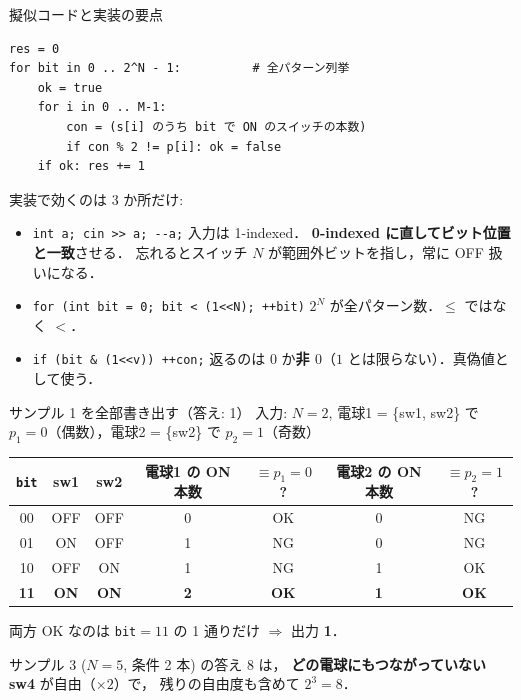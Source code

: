 \documentclass[dvipdfmx,aspectratio=169]{beamer}
\begin{document}
\begin{frame}[fragile]{擬似コードと実装の要点}
\begin{verbatim}
res = 0
for bit in 0 .. 2^N - 1:          # 全パターン列挙
    ok = true
    for i in 0 .. M-1:
        con = (s[i] のうち bit で ON のスイッチの本数)
        if con % 2 != p[i]: ok = false
    if ok: res += 1
\end{verbatim}

  \vspace{0.2em}
  実装で効くのは 3 か所だけ:
  \begin{itemize}
    \item \verb|int a; cin >> a; --a;| \quad 入力は 1-indexed．
      \textbf{0-indexed に直してビット位置と一致}させる．
      忘れるとスイッチ $N$ が範囲外ビットを指し，常に OFF 扱いになる．
    \item \verb|for (int bit = 0; bit < (1<<N); ++bit)| \quad
      $2^N$ が全パターン数．$\le$ ではなく $<$．
    \item \verb|if (bit & (1<<v)) ++con;| \quad
      返るのは $0$ か\textbf{非 $0$}（$1$ とは限らない）．真偽値として使う．
  \end{itemize}
\end{frame}

\begin{frame}{サンプル 1 を全部書き出す（答え: 1）}
  入力: $N=2$, 電球1 = \{sw1, sw2\} で $p_1=0$（偶数），電球2 = \{sw2\} で $p_2=1$（奇数）

  \vspace{0.5em}
  \centering
  \begin{tabular}{ccccccc}
    \toprule
    \texttt{bit} & sw1 & sw2 & 電球1 の ON 本数 & $\equiv p_1{=}0$? & 電球2 の ON 本数 & $\equiv p_2{=}1$?\\
    \midrule
    00 & OFF & OFF & 0 & \textcolor{ok}{OK}  & 0 & \textcolor{ng}{NG}\\
    01 & ON  & OFF & 1 & \textcolor{ng}{NG}  & 0 & \textcolor{ng}{NG}\\
    10 & OFF & ON  & 1 & \textcolor{ng}{NG}  & 1 & \textcolor{ok}{OK}\\
    \textbf{11} & \textbf{ON} & \textbf{ON} & \textbf{2} & \textcolor{ok}{\textbf{OK}} & \textbf{1} & \textcolor{ok}{\textbf{OK}}\\
    \bottomrule
  \end{tabular}

  \vspace{0.8em}
  \raggedright
  両方 OK なのは \texttt{bit}$=11$ の 1 通りだけ $\Rightarrow$ 出力 \textbf{1}．

  \vspace{0.4em}
  {\small サンプル 3 ($N=5$, 条件 2 本) の答え $8$ は，
  \textbf{どの電球にもつながっていない sw4} が自由（$\times 2$）で，
  残りの自由度も含めて $2^3 = 8$．}
\end{frame}
\end{document}
